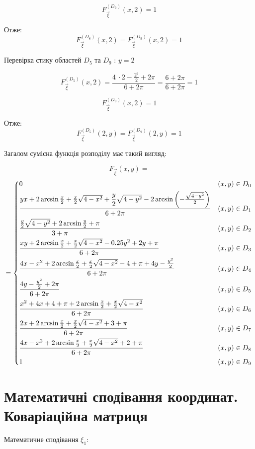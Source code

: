 \documentclass[14pt, a4paper, ukrainian]{extreport}
\begin{document}
	$$ F_{\vec\xi}^{\left({D_9}\right)}(x, 2) =  1
	$$
	
	Отже:	
	$$  F_{\vec\xi}^{\left({D_8}\right)}(x, 2) =  F_{\vec\xi}^{\left({D_9}\right)}(x, 2) = 1
	$$
	
	Перевірка стику областей $D_5$ та $D_9$ : $ y = 2$ 
	
	$$ F_{\vec\xi}^{\left({D_5}\right)}(x, 2) = \frac{4 \ \cdot 2 - \frac{2^2}{2} + 2\pi }{6 + 2\pi}= \frac{6 + 2\pi}{6 + 2\pi} = 1
	$$
	
	$$ F_{\vec\xi}^{\left({D_9}\right)}(x, 2) =  1
	$$
	
	Отже:	
	$$  F_{\vec\xi}^{\left({D_5}\right)}(2, y) =  F_{\vec\xi}^{\left({D_9}\right)}(2, y) = 1
	$$
	
	
	Загалом сумісна функція розподілу має такий вигляд:
	
	$$F_{\vec{\xi}}(x, y) =$$
	$$=\begin{dcases}
		0 & (x, y) \in D_0\\
		\dfrac{yx + 2\arcsin\frac{x}{2} + \frac{x}{2}\sqrt{4-x^2} + \dfrac{y}{2}\sqrt{4-y^2} - 2\arcsin{\left(-\frac{\sqrt{4-y^2}}{2}\right)}}{6+2\pi} & (x, y) \in D_1\\
		\dfrac{\frac{y}{2}\sqrt{4-y^2} + 2\arcsin\frac{y}{2} + \pi}{3+\pi} & (x, y) \in D_2\\
		\frac{xy + 2\arcsin\frac{x}{2} + \frac{x}{2}\sqrt{4-x^2} - 0.25y^2 + 2y + \pi}{6+2\pi} & (x, y) \in D_3\\
		\frac{4x -x^2 + 2\arcsin\frac{x}{2} + \frac{x}{2}\sqrt{4-x^2} - 4 + \pi + 4y - \frac{y^2}{2}}{6+2\pi} & (x, y) \in D_4\\
		\frac{4y - \frac{y^2}{2} + 2\pi }{6 + 2\pi} & (x, y) \in D_5\\
		\frac{x^2 +4x +4 +\pi + 2\arcsin\frac{x}{2} + \frac{x}{2}\sqrt{4-x^2}}{6+2\pi} & (x, y) \in D_6\\
		\frac{2x + 2\arcsin\frac{x}{2} + \frac{x}{2}\sqrt{4-x^2} + 3 + \pi}{6+2\pi}  & (x, y) \in D_7\\
		\frac{4x - x^2 + 2\arcsin\frac{x}{2} + \frac{x}{2}\sqrt{4-x^2} + 2 + \pi}{6+2\pi} & (x, y) \in D_8\\
		1 & (x, y) \in D_9\\
	\end{dcases}
	$$
	
		
	\section{Математичні сподівання координат. Коваріаційна матриця}
	
	Математичне сподівання $\xi_1$:
	
\end{document}
